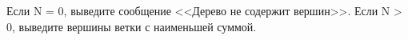Если N = 0, выведите сообщение <<Дерево не содержит вершин>>.
Если N > 0, выведите вершины ветки с наименьшей суммой.
